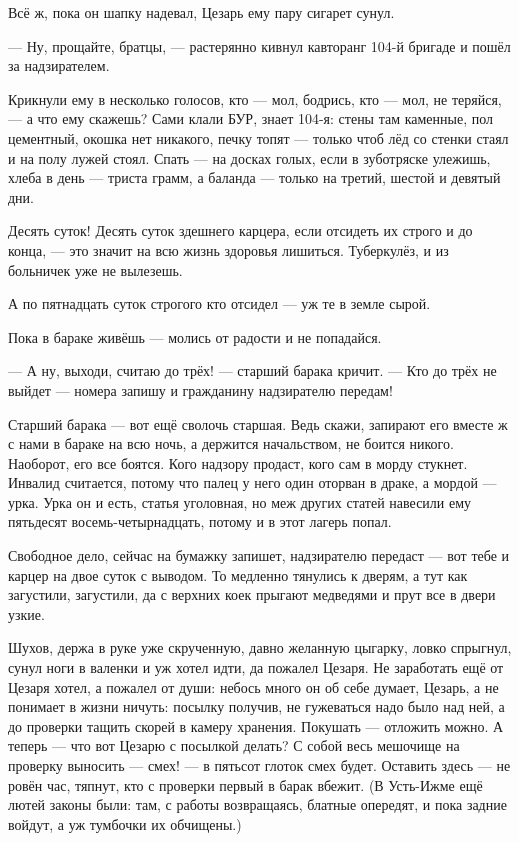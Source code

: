 Всё ж, пока он шапку надевал, Цезарь ему пару сигарет сунул.

--- Ну, прощайте, братцы, --- растерянно кивнул кавторанг 104-й бригаде и пошёл за надзирателем.

Крикнули ему в несколько голосов, кто --- мол, бодрись, кто --- мол, не теряйся, --- а что ему скажешь? Сами клали БУР, знает 104-я: стены там каменные, пол цементный, окошка нет никакого, печку топят --- только чтоб лёд со стенки стаял и на полу лужей стоял. Спать --- на досках голых, если в зуботряске улежишь, хлеба в день --- триста грамм, а баланда --- только на третий, шестой и девятый дни.

Десять суток! Десять суток здешнего карцера, если отсидеть их строго и до конца, --- это значит на всю жизнь здоровья лишиться. Туберкулёз, и из больничек уже не вылезешь.

А по пятнадцать суток строгого кто отсидел --- уж те в земле сырой.

Пока в бараке живёшь --- молись от радости и не попадайся.

--- А ну, выходи, считаю до трёх! --- старший барака кричит. --- Кто до трёх не выйдет --- номера запишу и гражданину надзирателю передам!

Старший барака --- вот ещё сволочь старшая. Ведь скажи, запирают его вместе ж с нами в бараке на всю ночь, а держится начальством, не боится никого. Наоборот, его все боятся. Кого надзору продаст, кого сам в морду стукнет. Инвалид считается, потому что палец у него один оторван в драке, а мордой --- урка. Урка он и есть, статья уголовная, но меж других статей навесили ему пятьдесят восемь-четырнадцать, потому и в этот лагерь попал.

Свободное дело, сейчас на бумажку запишет, надзирателю передаст --- вот тебе и карцер на двое суток с выводом. То медленно тянулись к дверям, а тут как загустили, загустили, да с верхних коек прыгают медведями и прут все в двери узкие.

Шухов, держа в руке уже скрученную, давно желанную цыгарку, ловко спрыгнул, сунул ноги в валенки и уж хотел идти, да пожалел Цезаря. Не заработать ещё от Цезаря хотел, а пожалел от души: небось много он об себе думает, Цезарь, а не понимает в жизни ничуть: посылку получив, не гужеваться надо было над ней, а до проверки тащить скорей в камеру хранения. Покушать --- отложить можно. А теперь --- что вот Цезарю с посылкой делать? С собой весь мешочище на проверку выносить --- смех! --- в пятьсот глоток смех будет. Оставить здесь --- не ровён час, тяпнут, кто с проверки первый в барак вбежит. (В Усть-Ижме ещё лютей законы были: там, с работы возвращаясь, блатные опередят, и пока задние войдут, а уж тумбочки их обчищены.)

